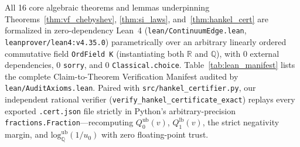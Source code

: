 \documentclass[11pt,a4paper]{article}
\theoremstyle{definition}
\newcommand{\R}{\mathbb{R}}
\newcommand{\Q}{\mathbb{Q}}
\begin{document}
All 16 core algebraic theorems and lemmas underpinning Theorems~\ref{thm:vf_chebyshev}, \ref{thm:si_laws}, and~\ref{thm:hankel_cert} are formalized in zero-dependency Lean~4 (\texttt{lean/ContinuumEdge.lean}, \texttt{leanprover/lean4:v4.35.0}) parametrically over an arbitrary linearly ordered commutative field \texttt{OrdField K} (instantiating both $\R$ and $\Q$), with 0 external dependencies, 0 \texttt{sorry}, and 0 \texttt{Classical.choice}. Table~\ref{tab:lean_manifest} lists the complete Claim-to-Theorem Verification Manifest audited by \texttt{lean/AuditAxioms.lean}. Paired with \texttt{src/hankel\_certifier.py}, our independent rational verifier (\texttt{verify\_hankel\_}\allowbreak\texttt{certificate\_exact}) replays every exported \texttt{.cert.json} file strictly in Python's arbitrary-precision \texttt{fractions.Fraction}—recomputing $Q_0^{\mathrm{ub}}(v)$, $Q_1^{\mathrm{lb}}(v)$, the strict negativity margin, and $\mathrm{log}_{\Q}^{\mathrm{ub}}(1/u_0)$ with zero floating-point trust.
\end{document}
